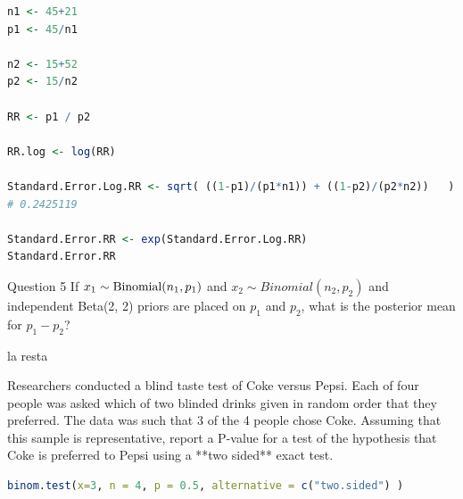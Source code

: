 \documentclass{homework}
\begin{document}
\begin{lstlisting}[language=R]
n1 <- 45+21
p1 <- 45/n1

n2 <- 15+52
p2 <- 15/n2

RR <- p1 / p2

RR.log <- log(RR) 

Standard.Error.Log.RR <- sqrt( ((1-p1)/(p1*n1)) + ((1-p2)/(p2*n2))   )
# 0.2425119

Standard.Error.RR <- exp(Standard.Error.Log.RR) 
Standard.Error.RR
\end{lstlisting}

\begin{tcolorbox}[title=Question 5]
Question 5
If $x_1 \sim \textnormal{Binomial}(n_1, p_1)$ and $x_2 \sim Binomial(n_2, p_2)$ and independent Beta(2, 2) priors are placed on $p_1$ and $p_2$, what is the posterior mean for $p_1 - p_2$?
\end{tcolorbox}

la resta 

\begin{tcolorbox}[title=Question 6]
Researchers conducted a blind taste test of Coke versus Pepsi. Each of four people was asked which of two blinded drinks given in random order that they preferred. The data was such that 3 of the 4 people chose Coke. Assuming that this sample is representative, report a P-value for a test of the hypothesis that Coke is preferred to Pepsi using a **two sided** exact test.
\end{tcolorbox}

\begin{lstlisting}[language=R]
binom.test(x=3, n = 4, p = 0.5, alternative = c("two.sided") )
\end{lstlisting}

\clearpage
\end{document}
